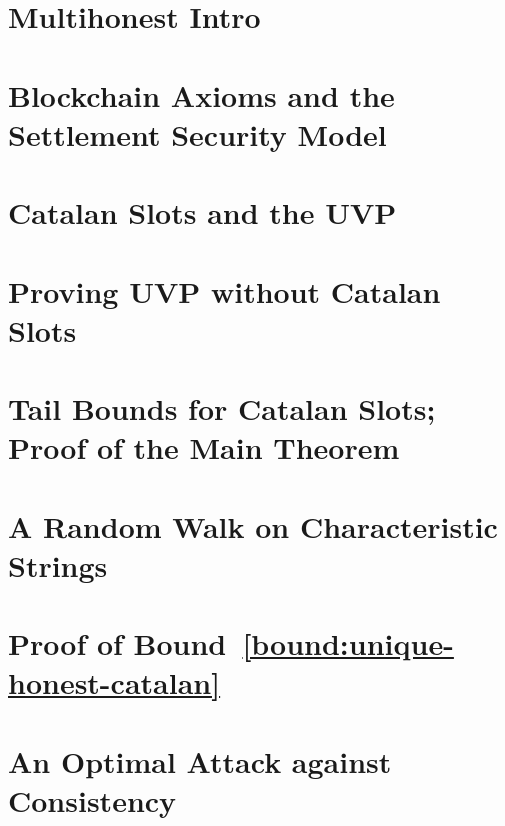 




\chapter{Multihonest Intro}\label{ch:intro-multihonest}


\chapter{Blockchain Axioms and the Settlement Security Model}\label{sec:model-multihonest}


\chapter{Catalan Slots and the UVP}\label{sec:catalan}\label{sec:definitions-multihonest}





\chapter{Proving UVP without Catalan Slots}\label{sec:fork-framework}



\chapter{Tail Bounds for Catalan Slots; Proof of the Main Theorem}\label{sec:bounds-main-proofs-multihonest}


\chapter{A Random Walk on Characteristic Strings}\label{sec:rand-walks}
 


\chapter[Proving the Tail Bound]{Proof of \texorpdfstring{Bound~\ref{bound:unique-honest-catalan}}{the First Tail Bound} }\label{sec:estimates-multihonest}



\chapter{An Optimal Attack against Consistency}\label{sec:opt-adversary}



